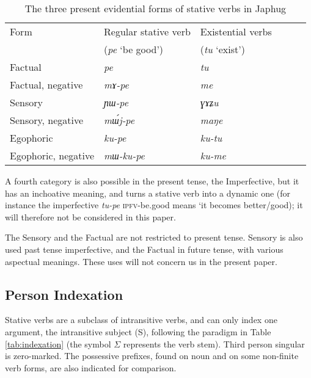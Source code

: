 \documentclass[oldfontcommands,oneside,a4paper,11pt]{article}
\newcommand{\ipa}[1]{{\phon\textit{#1}}} %
\newcommand{\ro}{$\Sigma$}
\begin{document}
\begin{table}[H]
\caption{The three present evidential forms of stative verbs in Japhug} \label{tab:three} \centering
\begin{tabular}{llllll}
\toprule
Form & Regular stative verb & Existential verbs \\
&(\ipa{pe} `be good') & (\ipa{tu} `exist') \\
\midrule
Factual & \ipa{pe} & \ipa{tu} \\
Factual, negative & \ipa{mɤ-pe} & \ipa{me} \\
Sensory & \ipa{ɲɯ-pe} & \ipa{ɣɤʑu} \\
Sensory, negative & \ipa{mɯ́j-pe} & \ipa{maŋe} \\
Egophoric &  \ipa{ku-pe} & \ipa{ku-tu} \\
Egophoric, negative & \ipa{mɯ-ku-pe} & \ipa{ku-me} \\
\midrule
\end{tabular}
\end{table}

A fourth category is also possible in the present tense, the Imperfective, but it has an inchoative meaning, and turns a stative verb into a dynamic one (for instance the imperfective \ipa{tu-pe} \textsc{ipfv}-be.good means `it becomes better/good); it will therefore not be considered in this paper.

The Sensory and the Factual are not restricted to present tense. Sensory is also used past tense imperfective, and the Factual in future tense, with various aspectual meanings. These uses will not concern us in the present paper.


\subsection{Person Indexation}
Stative verbs are a subclass of intransitive verbs, and can only index one argument, the intransitive subject (S), following the paradigm in Table \ref{tab:indexation} (the symbol \ro{} represents the verb stem). Third person singular is zero-marked. The possessive prefixes, found on noun and on some non-finite verb forms, are also indicated for comparison.
\end{document}
